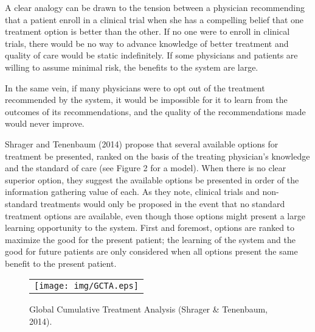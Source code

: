 \documentclass[]{spie}  %
\begin{document}
A clear analogy can be drawn to the tension between a physician recommending that a patient enroll in a clinical trial when she has a compelling belief that one treatment option is better than the other. If no one were to enroll in clinical trials, there would be no way to advance knowledge of better treatment and quality of care would be static indefinitely. If some physicians and patients are willing to assume minimal risk, the benefits to the system are large.

In the same vein, if many physicians were to opt out of the treatment recommended by the system, it would be impossible for it to learn from the outcomes of its recommendations, and the quality of the recommendations made would never improve.

Shrager and Tenenbaum (2014) propose that several available options for treatment be presented, ranked on the basis of the treating physician’s knowledge and the standard of care (see Figure 2 for a model). When there is no clear superior option, they suggest the available options be presented in order of the information gathering value of each. As they note, clinical trials and non-standard treatments would only be proposed in the event that no standard treatment options are available, even though those options might present a large learning opportunity to the system. First and foremost, options are ranked to maximize the good for the present patient; the learning of the system and the good for future patients are only considered when all options present the same benefit to the present patient.


   \begin{figure}
   \begin{center}
   \begin{tabular}{c}
   \texttt{[image: img/GCTA.eps]}
   \end{tabular}
   \end{center}
   \caption[example]
   { \label{fig:example}
Global Cumulative Treatment Analysis (Shrager \& Tenenbaum, 2014).
}
   \end{figure}

\end{document}
